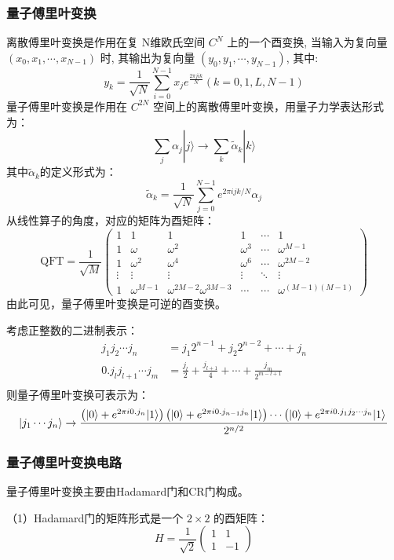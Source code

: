 \documentclass[12pt,hyperref,a4paper,UTF8]{ctexart}
\begin{document}
\subsubsection{量子傅里叶变换}
离散傅里叶变换是作用在复 $\mathrm{N}$维欧氏空间 $C^N$ 上的一个酉变换, 当输入为复向量 $\left(x_0, x_1, \cdots, x_{N-1}\right)$ 时, 其输出为复向量 $\left(y_0, y_1, \cdots, y_{N-1}\right)$, 其中:
$$
y_k=\frac{1}{\sqrt{N}} \sum_{i=0}^{N-1} x_j e^{\frac{2 \pi j i k}{N}}(k=0,1, L, N-1)
$$
量子傅里叶变换是作用在 $C^{2 N}$ 空间上的离散傅里叶变换，用量子力学表达形式为：
$$
\sum_j \alpha_j|j\rangle \rightarrow \sum_k \tilde{\alpha}_k|k\rangle
$$
其中$\tilde{\alpha}_k$的定义形式为：
$$
\tilde{\alpha}_k=\frac{1}{\sqrt{N}} \sum_{j=0}^{N-1} e^{2 \pi i j k / N} \alpha_j
$$
从线性算子的角度，对应的矩阵为酉矩阵：
$$
\mathrm{QFT}=\frac{1}{\sqrt{M}}\left(\begin{array}{cccccc}
1 & 1 & 1 & 1 & \cdots & 1 \\
1 & \omega & \omega^2 & \omega^3 & \cdots & \omega^{M-1} \\
1 & \omega^2 & \omega^4 & \omega^6 & \cdots & \omega^{2 M-2} \\
\vdots & \vdots & \vdots & \vdots & \ddots & \vdots \\
1 & \omega^{M-1} & \omega^{2 M-2} \omega^{3 M-3} & \cdots & \cdots & \omega^{(M-1)(M-1)}
\end{array}\right)
$$
由此可见，量子傅里叶变换是可逆的酉变换。

\vskip 10pt
考虑正整数的二进制表示：
$$
\begin{aligned}
j_1 j_2 \cdots j_n&=j_1 2^{n-1}+j_2 2^{n-2}+\cdots+j_n\\
0 . j_l j_{l+1} \cdots j_m&=\frac{j_l}{2}+\frac{j_{l+1}}{4}+\cdots+\frac{j_m}{2^{m-l+1}}\\
\end{aligned}
$$
则量子傅里叶变换可表示为：
$$
\lvert j_1 \cdots j_n \rangle\rightarrow
\frac{\left(|0\rangle+e^{2 \pi i 0 . j_n}|1\rangle\right)\left(|0\rangle+e^{2 \pi i 0 . j_{n-1} j_n}|1\rangle\right) \cdots\left(|0\rangle+e^{2 \pi i 0 . j_1 j_2 \cdots j_n}|1\rangle\right.}{2^{n / 2}}
$$

\subsubsection{量子傅里叶变换电路}
量子傅里叶变换主要由Hadamard门和CR门构成。

\vskip 5pt
（1）Hadamard门的矩阵形式是一个 $2 \times 2$ 的酉矩阵：
$$
H=\frac{1}{\sqrt{2}}\left(\begin{array}{cc}
1 & 1 \\
1 & -1
\end{array}\right)
$$
\end{document}
